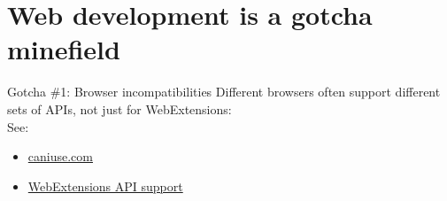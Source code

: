 \documentclass[../index.tex]{subfiles}
\begin{document}

\renewcommand{\sectiontitle}{Web development is a gotcha minefield}
\section{\sectiontitle}

\renewcommand{\currenttitle}{Gotcha \#1: Browser incompatibilities}
\begin{frame}[fragile]{\currenttitle}
  Different browsers often support different sets of APIs, not just for
  WebExtensions: \\[2em]

  See:
  \begin{itemize}
    \item \href{https://caniuse.com/}{caniuse.com}
    \item \href{https://developer.mozilla.org/en-US/docs/Mozilla/Add-ons/WebExtensions/Browser_support_for_JavaScript_APIs}
               {WebExtensions API support}
  \end{itemize}
\end{frame}

\end{document}
